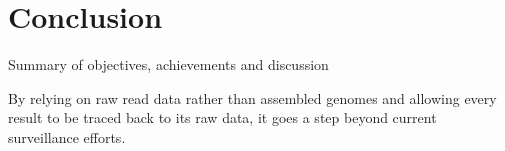 \chapter{Conclusion}\label{chap:conclusion}
Summary of objectives, achievements and discussion

By relying on raw read data rather than assembled genomes and allowing every result to be traced back to its raw data, it goes a step beyond current surveillance efforts.